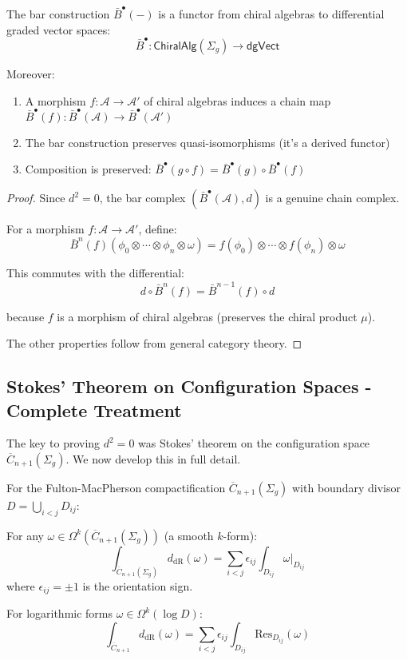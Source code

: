 \begin{corollary}\label{cor:bar-functorial}
The bar construction $\bar{B}^{\bullet}(-)$ is a functor from chiral algebras to differential graded vector spaces:
$$\bar{B}^{\bullet}: \mathsf{ChiralAlg}(\Sigma_g) \to \mathsf{dgVect}$$

Moreover:
\begin{enumerate}
\item A morphism $f: \mathcal{A} \to \mathcal{A}'$ of chiral algebras induces a chain map $\bar{B}^{\bullet}(f): \bar{B}^{\bullet}(\mathcal{A}) \to \bar{B}^{\bullet}(\mathcal{A}')$
\item The bar construction preserves quasi-isomorphisms (it's a derived functor)
\item Composition is preserved: $\bar{B}^{\bullet}(g \circ f) = \bar{B}^{\bullet}(g) \circ \bar{B}^{\bullet}(f)$
\end{enumerate}
\end{corollary}

\begin{proof}
Since $d^2 = 0$, the bar complex $(\bar{B}^{\bullet}(\mathcal{A}), d)$ is a genuine chain complex.

For a morphism $f: \mathcal{A} \to \mathcal{A}'$, define:
$$\bar{B}^n(f)(\phi_0 \otimes \cdots \otimes \phi_n \otimes \omega) = f(\phi_0) \otimes \cdots \otimes f(\phi_n) \otimes \omega$$

This commutes with the differential:
$$d \circ \bar{B}^n(f) = \bar{B}^{n-1}(f) \circ d$$

because $f$ is a morphism of chiral algebras (preserves the chiral product $\mu$).

The other properties follow from general category theory.
\end{proof}

\subsection{Stokes' Theorem on Configuration Spaces - Complete Treatment}

The key to proving $d^2 = 0$ was Stokes' theorem on the configuration space $\overline{C}_{n+1}(\Sigma_g)$. We now develop this in full detail.

\begin{theorem}\label{thm:stokes-config}
For the Fulton-MacPherson compactification $\overline{C}_{n+1}(\Sigma_g)$ with boundary divisor $D = \bigcup_{i<j} D_{ij}$:

For any $\omega \in \Omega^k(\overline{C}_{n+1}(\Sigma_g))$ (a smooth $k$-form):
$$\int_{\overline{C}_{n+1}(\Sigma_g)} d_{\text{dR}}(\omega) = \sum_{i<j} \epsilon_{ij} \int_{D_{ij}} \omega|_{D_{ij}}$$
where $\epsilon_{ij} = \pm 1$ is the orientation sign.

For logarithmic forms $\omega \in \Omega^k(\log D)$:
$$\int_{\overline{C}_{n+1}} d_{\text{dR}}(\omega) = \sum_{i<j} \epsilon_{ij} \int_{D_{ij}} \text{Res}_{D_{ij}}(\omega)$$
\end{theorem}

